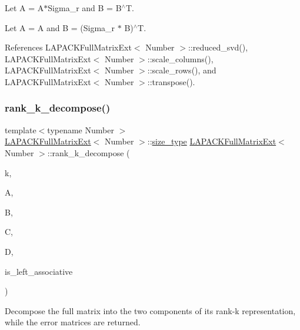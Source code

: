 Let A = A$\ast$\+Sigma\+\_\+r and B = B$^\wedge$T.

Let A = A and B = (Sigma\+\_\+r $\ast$ B)$^\wedge$T.

References L\+A\+P\+A\+C\+K\+Full\+Matrix\+Ext$<$ Number $>$\+::reduced\+\_\+svd(), L\+A\+P\+A\+C\+K\+Full\+Matrix\+Ext$<$ Number $>$\+::scale\+\_\+columns(), L\+A\+P\+A\+C\+K\+Full\+Matrix\+Ext$<$ Number $>$\+::scale\+\_\+rows(), and L\+A\+P\+A\+C\+K\+Full\+Matrix\+Ext$<$ Number $>$\+::transpose().

\mbox{\label{classLAPACKFullMatrixExt_a935a8f39a295ca51844f5f6669e8dc32}} 
\subsubsection{\texorpdfstring{rank\+\_\+k\+\_\+decompose()}{rank\_k\_decompose()}\hspace{0.1cm}{\footnotesize\ttfamily [5/5]}}
{\footnotesize\ttfamily template$<$typename Number $>$ \\
\hyperlink{classLAPACKFullMatrixExt}{L\+A\+P\+A\+C\+K\+Full\+Matrix\+Ext}$<$ Number $>$\+::\hyperlink{classLAPACKFullMatrixExt_a5cf5f4a6104dc17029210b5ca52bf574}{size\+\_\+type} \hyperlink{classLAPACKFullMatrixExt}{L\+A\+P\+A\+C\+K\+Full\+Matrix\+Ext}$<$ Number $>$\+::rank\+\_\+k\+\_\+decompose (\begin{DoxyParamCaption}\item[{const unsigned int}]{k,  }\item[{\hyperlink{classLAPACKFullMatrixExt}{L\+A\+P\+A\+C\+K\+Full\+Matrix\+Ext}$<$ Number $>$ \&}]{A,  }\item[{\hyperlink{classLAPACKFullMatrixExt}{L\+A\+P\+A\+C\+K\+Full\+Matrix\+Ext}$<$ Number $>$ \&}]{B,  }\item[{\hyperlink{classLAPACKFullMatrixExt}{L\+A\+P\+A\+C\+K\+Full\+Matrix\+Ext}$<$ Number $>$ \&}]{C,  }\item[{\hyperlink{classLAPACKFullMatrixExt}{L\+A\+P\+A\+C\+K\+Full\+Matrix\+Ext}$<$ Number $>$ \&}]{D,  }\item[{bool}]{is\+\_\+left\+\_\+associative }\end{DoxyParamCaption})}

Decompose the full matrix into the two components of its rank-\/k representation, while the error matrices are returned.


